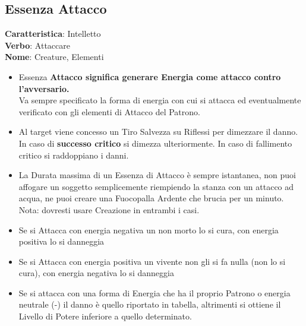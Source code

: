 \documentclass[a4paper,11pt,twoside,openany]{book}
\begin{document}
\pagebreak

\subsection{Essenza Attacco}

\textbf{Caratteristica}: Intelletto\\
\textbf{Verbo}: Attaccare\\
\textbf{Nome}: Creature, Elementi\\

\label{essenza-attacco---intelletto}
\begin{itemize}
	\item
     Essenza \textbf{Attacco significa generare Energia come attacco contro l'avversario.}\\
Va sempre specificato la forma di energia con cui si attacca ed eventualmente verificato con gli elementi di Attacco del Patrono.
	\item
Al target viene concesso un Tiro Salvezza su Riflessi per dimezzare il danno. In caso di \textbf{successo critico} si dimezza ulteriormente. In caso di fallimento critico si raddoppiano i danni.
	\item
La Durata massima di un Essenza di Attacco è sempre istantanea, non puoi affogare un soggetto semplicemente riempiendo la stanza con un attacco ad acqua, ne puoi creare una Fuocopalla Ardente che brucia per un minuto.
Nota: dovresti usare Creazione in entrambi i casi.
	\item
Se si Attacca con energia negativa un non morto lo si cura, con energia positiva lo si danneggia
	\item
Se si Attacca con energia positiva un vivente non gli si fa nulla (non lo si cura), con energia negativa lo si danneggia
	\item
Se si attacca con una forma di Energia che ha il proprio Patrono o energia neutrale (-) il danno è quello riportato in tabella, altrimenti si ottiene il Livello di Potere inferiore a quello determinato.
\end{itemize}

\bigskip
\end{document}

